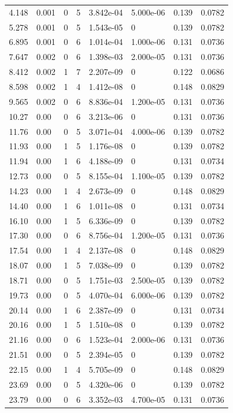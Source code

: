 \documentclass[preview]{standalone}
\begin{document}
{{\begin{tabular}{L{1.2cm}C{1.2cm} C{0.3cm}C{0.5cm} C{1.4cm}C{1.4cm} C{1.4cm}C{1.4cm}}
  4.148  &  0.001  & 0     &  5 &  3.842e-04  & 5.000e-06  & 0.139 &  0.0782   \\ 
  5.278  &  0.001  & 0     &  5 &  1.543e-05  & 0  & 0.139 &  0.0782   \\ 
  6.895  &  0.001  & 0     &  6 &  1.014e-04  & 1.000e-06  & 0.131 &  0.0736   \\ 
  7.647  &  0.002  & 0     &  6 &  1.398e-03  & 2.000e-05  & 0.131 &  0.0736   \\ 
  8.412  &  0.002  & 1     &  7 &  2.207e-09  & 0  & 0.122 &  0.0686   \\ 
  8.598  &  0.002  & 1     &  4 &  1.412e-08  & 0  & 0.148 &  0.0829   \\ 
  9.565  &  0.002  & 0     &  6 &  8.836e-04  & 1.200e-05  & 0.131 &  0.0736   \\ 
  10.27  &  0.00  & 0     &  6 &  3.213e-06  & 0  & 0.131 &  0.0736   \\ 
  11.76  &  0.00  & 0     &  5 &  3.071e-04  & 4.000e-06  & 0.139 &  0.0782   \\ 
  11.93  &  0.00  & 1     &  5 &  1.176e-08  & 0  & 0.139 &  0.0782   \\ 
  11.94  &  0.00  & 1     &  6 &  4.188e-09  & 0  & 0.131 &  0.0734   \\ 
  12.73  &  0.00  & 0     &  5 &  8.155e-04  & 1.100e-05  & 0.139 &  0.0782   \\ 
  14.23  &  0.00  & 1     &  4 &  2.673e-09  & 0  & 0.148 &  0.0829   \\ 
  14.40  &  0.00  & 1     &  6 &  1.011e-08  & 0  & 0.131 &  0.0734   \\ 
  16.10  &  0.00  & 1     &  5 &  6.336e-09  & 0  & 0.139 &  0.0782   \\ 
  17.30  &  0.00  & 0     &  6 &  8.756e-04  & 1.200e-05  & 0.131 &  0.0736   \\ 
  17.54  &  0.00  & 1     &  4 &  2.137e-08  & 0  & 0.148 &  0.0829   \\ 
  18.07  &  0.00  & 1     &  5 &  7.038e-09  & 0  & 0.139 &  0.0782   \\ 
  18.71  &  0.00  & 0     &  5 &  1.751e-03  & 2.500e-05  & 0.139 &  0.0782   \\ 
  19.73  &  0.00  & 0     &  5 &  4.070e-04  & 6.000e-06  & 0.139 &  0.0782   \\ 
  20.14  &  0.00  & 1     &  6 &  2.387e-09  & 0  & 0.131 &  0.0734   \\ 
  20.16  &  0.00  & 1     &  5 &  1.510e-08  & 0  & 0.139 &  0.0782   \\ 
  21.16  &  0.00  & 0     &  6 &  1.523e-04  & 2.000e-06  & 0.131 &  0.0736   \\ 
  21.51  &  0.00  & 0     &  5 &  2.394e-05  & 0  & 0.139 &  0.0782   \\ 
  22.15  &  0.00  & 1     &  4 &  5.705e-09  & 0  & 0.148 &  0.0829   \\ 
  23.69  &  0.00  & 0     &  5 &  4.320e-06  & 0  & 0.139 &  0.0782   \\ 
  23.79  &  0.00  & 0     &  6 &  3.352e-03  & 4.700e-05  & 0.131 &  0.0736   \\ 
\hline 
\end{tabular} 

}}
\end{document}

